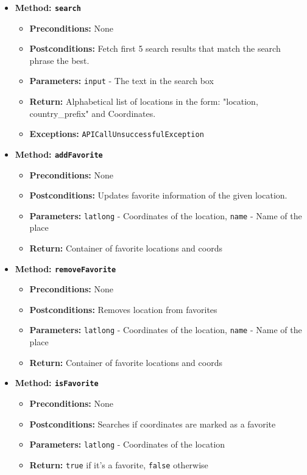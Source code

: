 \documentclass[a4paper,10pt]{article}
\begin{document}
\begin{itemize}
    \item \textbf{Method: \texttt{search}}
    \begin{itemize}
        \item \textbf{Preconditions:} None
        \item \textbf{Postconditions:} Fetch first 5 search results that match the search phrase the best.
        \item \textbf{Parameters:} \texttt{input} - The text in the search box
        \item \textbf{Return:} Alphabetical list of locations in the form: "location, country\_prefix" and Coordinates.
        \item \textbf{Exceptions:} \texttt{APICallUnsuccessfulException}
    \end{itemize}
    
    \item \textbf{Method: \texttt{addFavorite}}
    \begin{itemize}
        \item \textbf{Preconditions:} None
        \item \textbf{Postconditions:} Updates favorite information of the given location.
        \item \textbf{Parameters:} \texttt{latlong} - Coordinates of the location, \texttt{name} - Name of the place
        \item \textbf{Return:} Container of favorite locations and coords
    \end{itemize}
    
    \item \textbf{Method: \texttt{removeFavorite}}
    \begin{itemize}
        \item \textbf{Preconditions:} None
        \item \textbf{Postconditions:} Removes location from favorites
        \item \textbf{Parameters:} \texttt{latlong} - Coordinates of the location, \texttt{name} - Name of the place
        \item \textbf{Return:} Container of favorite locations and coords
    \end{itemize}
    
    \item \textbf{Method: \texttt{isFavorite}}
    \begin{itemize}
        \item \textbf{Preconditions:} None
        \item \textbf{Postconditions:} Searches if coordinates are marked as a favorite
        \item \textbf{Parameters:} \texttt{latlong} - Coordinates of the location
        \item \textbf{Return:} \texttt{true} if it's a favorite, \texttt{false} otherwise
    \end{itemize}
    

\end{itemize}
\end{document}
